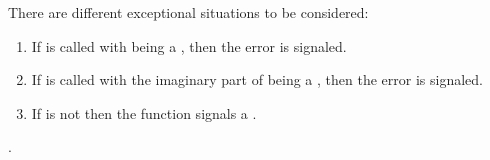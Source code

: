 \documentclass[../Exponentials-Logarithms-Trigonometry.tex]{subfiles}
\begin{document}
\DExceptional{}

There are different exceptional situations to be considered:
\begin{enumerate}
\item If  is called with
   being a , then the
   error is signaled.
\item If  is called with the imaginary
  part of  being a , then the
   error is signaled.
\item If  is not \CL{}
   then the function  signals a
  .
\end{enumerate}

\DSeeAlso{}

.
\end{document}
